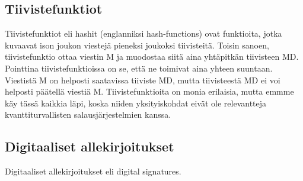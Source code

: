  \subsection{Tiivistefunktiot}
 Tiivistefunktiot eli hashit (englanniksi hash-functions) ovat funktioita, jotka kuvaavat ison joukon viestejä pieneksi joukoksi tiivisteitä. Toisin sanoen, tiivistefunktio ottaa viestin M ja muodostaa siitä aina yhtäpitkän tiivisteen MD. Pointtina tiivistefunktioissa on se, että ne toimivat aina yhteen suuntaan. Viestistä M on helposti saatavissa tiiviste MD, mutta tiivisteestä MD ei voi helposti päätellä viestiä M. Tiivistefunktioita on monia erilaisia, mutta emmme käy tässä kaikkia läpi, koska niiden yksityiskohdat eivät ole relevantteja kvanttiturvallisten salausjärjestelmien kanssa.
 
 \subsection{Digitaaliset allekirjoitukset}
 Digitaaliset allekirjoitukset eli digital signatures.
